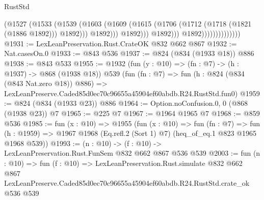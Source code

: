 \begin{lexlean}{RustStd}
\begin{coremodule}
                                        (@1527
                                          (@1533
                                            (@1539
                                              (@1603
                                                (@1609
                                                  (@1615
                                                    (@1706
                                                      (@1712 (@1718 (@1821 (@1886 @1892))) @1892)))
                                                  @1892)))
                                            @1892)))
                                      @1892)))
                                @1892))))))))))))))
@1931 := LexLeanPreservation.Rust.CrateOK @832 @662 @867
@1932 := Nat.casesOn.{0}
@1933 := @843 @536
@1937 := @824 (@834 (@1933 @18)) @886
@1938 := @843 @533
@1955 := @1932
    (fun (y : @10) => (fn : @7) -> (h : @1937) -> @868 (@1938 @18))
    @539
    (fun (fn : @7) =>
    fun (h : @824 (@834 (@843 Nat.zero @18)) @886) =>
    LexLeanPreserve.Caded85d0ec70c96655a45904ef60abdb.R24.RustStd.fun0)
@1959 := @824 (@834 (@1933 @23)) @886
@1964 := Option.noConfusion.{0, 0} (@868 (@1938 @23)) @7
@1965 := @225 @7
@1967 := @1964 @1965 @7
@1968 := @859 @536
@1985 := fun (x : @10) =>
  @1955
    (fun (x : @10) =>
    fun (fn : @7) =>
    fun (h : @1959) => @1967 @1968 (Eq.refl.{2} (Sort 1) @7) (heq_of_eq.{1} @823 @1965 @1968 @539))
@1993 := (n : @10) -> (f : @10) -> LexLeanPreservation.Rust.FunSem @832 @662 @867 @536 @539
@2003 := fun (n : @10) =>
  fun (f : @10) =>
  LexLeanPreservation.Rust.simulate
    @832
    @662
    @867
    LexLeanPreserve.Caded85d0ec70c96655a45904ef60abdb.R24.RustStd.crate_ok
    @536
    @539
\end{coremodule}
\end{lexlean}
